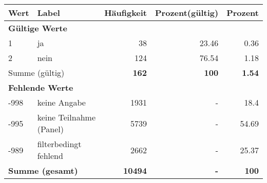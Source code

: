     \begin{longtable}{lXrrr}
     \toprule
     \textbf{Wert} & \textbf{Label} & \textbf{Häufigkeit} & \textbf{Prozent(gültig)} & \textbf{Prozent} \\
     \endhead
     \midrule
     \multicolumn{5}{l}{\textbf{Gültige Werte}}\\

     1 &
     \multicolumn{1}{X}{ ja   } &


       \num{38} &
       \num[round-mode=places,round-precision=2]{23,46} &
         \num[round-mode=places,round-precision=2]{0,36} \\

     2 &
     \multicolumn{1}{X}{ nein   } &


       \num{124} &
       \num[round-mode=places,round-precision=2]{76,54} &
         \num[round-mode=places,round-precision=2]{1,18} \\
     \midrule
     \multicolumn{2}{l}{Summe (gültig)} &
       \textbf{\num{162}} &
     \textbf{100} &
       \textbf{\num[round-mode=places,round-precision=2]{1,54}} \\
     \multicolumn{5}{l}{\textbf{Fehlende Werte}}\\
       -998 &
       keine Angabe &
         \num{1931} &
        - &
         \num[round-mode=places,round-precision=2]{18,4} \\
       -995 &
       keine Teilnahme (Panel) &
         \num{5739} &
        - &
         \num[round-mode=places,round-precision=2]{54,69} \\
       -989 &
       filterbedingt fehlend &
         \num{2662} &
        - &
         \num[round-mode=places,round-precision=2]{25,37} \\
     \midrule
     \multicolumn{2}{l}{\textbf{Summe (gesamt)}} &
          \textbf{\num{10494}} &
        \textbf{-} &
        \textbf{100} \\
     \bottomrule
     \end{longtable}
     
